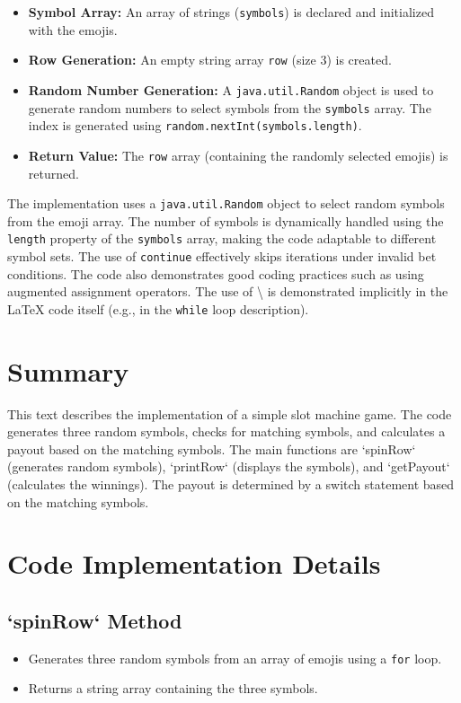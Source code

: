 \documentclass{article}
\begin{document}
\begin{itemize}
    \item \textbf{Symbol Array:} An array of strings (\texttt{symbols}) is declared and initialized with the emojis.
    \item \textbf{Row Generation:} An empty string array \texttt{row} (size 3) is created.
    \item \textbf{Random Number Generation:} A \texttt{java.util.Random} object is used to generate random numbers to select symbols from the \texttt{symbols} array.  The index is generated using \texttt{random.nextInt(symbols.length)}.
    \item \textbf{Return Value:} The \texttt{row} array (containing the randomly selected emojis) is returned.
\end{itemize}

The implementation uses a \texttt{java.util.Random} object to select random symbols from the emoji array.  The number of symbols is dynamically handled using the \texttt{length} property of the \texttt{symbols} array, making the code adaptable to different symbol sets.  The use of \texttt{continue} effectively skips iterations under invalid bet conditions.  The code also demonstrates good coding practices such as using augmented assignment operators.  The use of \textbackslash{} is demonstrated implicitly in the LaTeX code itself (e.g., in the \texttt{while} loop description).


\section*{Summary}

This text describes the implementation of a simple slot machine game.  The code generates three random symbols, checks for matching symbols, and calculates a payout based on the matching symbols. The main functions are `spinRow` (generates random symbols), `printRow` (displays the symbols), and `getPayout` (calculates the winnings). The payout is determined by a switch statement based on the matching symbols.

\section*{Code Implementation Details}

\subsection*{`spinRow` Method}
\begin{itemize}
    \item Generates three random symbols from an array of emojis using a \texttt{for} loop.
    \item Returns a string array containing the three symbols.
\end{itemize}
\end{document}
